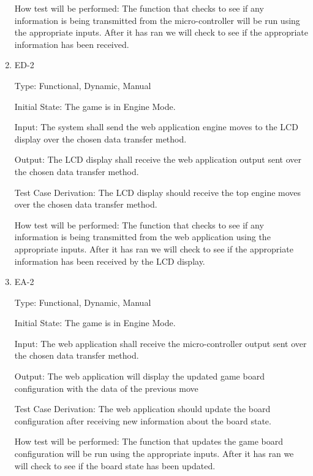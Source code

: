 \documentclass[12pt, titlepage]{article}
\begin{document}
\begin{enumerate}
    How test will be performed: The function that checks to see if any information is being transmitted from the micro-controller
    will be run using the appropriate inputs. After it has ran we will check to see if the appropriate information has been received.

    \item{ED-2\\}

    Type: Functional, Dynamic, Manual
                      
    Initial State: The game is in Engine Mode.
                        
    Input: The system shall send the web application engine moves to the LCD display over the
    chosen data transfer method.
                        
    Output: The LCD display shall receive the web application output sent over the chosen data transfer
    method.
                        
    Test Case Derivation: The LCD display should receive the top engine moves over the chosen data transfer method. 

    How test will be performed: The function that checks to see if any information is being transmitted from the web application 
    using the appropriate inputs. After it has ran we will check to see if the appropriate information has been received by the LCD display.

    \item{EA-2\\}

    Type: Functional, Dynamic, Manual
                      
    Initial State: The game is in Engine Mode.
                        
    Input: The web application shall receive the micro-controller output sent over the chosen data transfer
    method.
                        
    Output: The web application will display the updated game board configuration with the data
    of the previous move
                        
    Test Case Derivation: The web application should update the board configuration after receiving new information about the board state. 

    How test will be performed: The function that updates the game board configuration
    will be run using the appropriate inputs. After it has ran we will check to see if the board state has been updated.


\end{enumerate}
\end{document}
